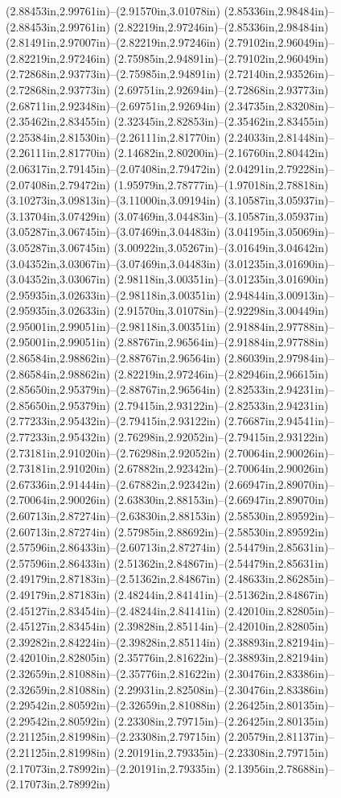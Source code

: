 (2.88453in,2.99761in)--(2.91570in,3.01078in) (2.85336in,2.98484in)--(2.88453in,2.99761in) (2.82219in,2.97246in)--(2.85336in,2.98484in) (2.81491in,2.97007in)--(2.82219in,2.97246in) (2.79102in,2.96049in)--(2.82219in,2.97246in) (2.75985in,2.94891in)--(2.79102in,2.96049in) (2.72868in,2.93773in)--(2.75985in,2.94891in) (2.72140in,2.93526in)--(2.72868in,2.93773in) (2.69751in,2.92694in)--(2.72868in,2.93773in) (2.68711in,2.92348in)--(2.69751in,2.92694in) (2.34735in,2.83208in)--(2.35462in,2.83455in) (2.32345in,2.82853in)--(2.35462in,2.83455in) (2.25384in,2.81530in)--(2.26111in,2.81770in) (2.24033in,2.81448in)--(2.26111in,2.81770in) (2.14682in,2.80200in)--(2.16760in,2.80442in) (2.06317in,2.79145in)--(2.07408in,2.79472in) (2.04291in,2.79228in)--(2.07408in,2.79472in) (1.95979in,2.78777in)--(1.97018in,2.78818in) (3.10273in,3.09813in)--(3.11000in,3.09194in) (3.10587in,3.05937in)--(3.13704in,3.07429in) (3.07469in,3.04483in)--(3.10587in,3.05937in) (3.05287in,3.06745in)--(3.07469in,3.04483in) (3.04195in,3.05069in)--(3.05287in,3.06745in) (3.00922in,3.05267in)--(3.01649in,3.04642in) (3.04352in,3.03067in)--(3.07469in,3.04483in) (3.01235in,3.01690in)--(3.04352in,3.03067in) (2.98118in,3.00351in)--(3.01235in,3.01690in) (2.95935in,3.02633in)--(2.98118in,3.00351in) (2.94844in,3.00913in)--(2.95935in,3.02633in) (2.91570in,3.01078in)--(2.92298in,3.00449in) (2.95001in,2.99051in)--(2.98118in,3.00351in) (2.91884in,2.97788in)--(2.95001in,2.99051in) (2.88767in,2.96564in)--(2.91884in,2.97788in) (2.86584in,2.98862in)--(2.88767in,2.96564in) (2.86039in,2.97984in)--(2.86584in,2.98862in) (2.82219in,2.97246in)--(2.82946in,2.96615in) (2.85650in,2.95379in)--(2.88767in,2.96564in) (2.82533in,2.94231in)--(2.85650in,2.95379in) (2.79415in,2.93122in)--(2.82533in,2.94231in) (2.77233in,2.95432in)--(2.79415in,2.93122in) (2.76687in,2.94541in)--(2.77233in,2.95432in) (2.76298in,2.92052in)--(2.79415in,2.93122in) (2.73181in,2.91020in)--(2.76298in,2.92052in) (2.70064in,2.90026in)--(2.73181in,2.91020in) (2.67882in,2.92342in)--(2.70064in,2.90026in) (2.67336in,2.91444in)--(2.67882in,2.92342in) (2.66947in,2.89070in)--(2.70064in,2.90026in) (2.63830in,2.88153in)--(2.66947in,2.89070in) (2.60713in,2.87274in)--(2.63830in,2.88153in) (2.58530in,2.89592in)--(2.60713in,2.87274in) (2.57985in,2.88692in)--(2.58530in,2.89592in) (2.57596in,2.86433in)--(2.60713in,2.87274in) (2.54479in,2.85631in)--(2.57596in,2.86433in) (2.51362in,2.84867in)--(2.54479in,2.85631in) (2.49179in,2.87183in)--(2.51362in,2.84867in) (2.48633in,2.86285in)--(2.49179in,2.87183in) (2.48244in,2.84141in)--(2.51362in,2.84867in) (2.45127in,2.83454in)--(2.48244in,2.84141in) (2.42010in,2.82805in)--(2.45127in,2.83454in) (2.39828in,2.85114in)--(2.42010in,2.82805in) (2.39282in,2.84224in)--(2.39828in,2.85114in) (2.38893in,2.82194in)--(2.42010in,2.82805in) (2.35776in,2.81622in)--(2.38893in,2.82194in) (2.32659in,2.81088in)--(2.35776in,2.81622in) (2.30476in,2.83386in)--(2.32659in,2.81088in) (2.29931in,2.82508in)--(2.30476in,2.83386in) (2.29542in,2.80592in)--(2.32659in,2.81088in) (2.26425in,2.80135in)--(2.29542in,2.80592in) (2.23308in,2.79715in)--(2.26425in,2.80135in) (2.21125in,2.81998in)--(2.23308in,2.79715in) (2.20579in,2.81137in)--(2.21125in,2.81998in) (2.20191in,2.79335in)--(2.23308in,2.79715in) (2.17073in,2.78992in)--(2.20191in,2.79335in) (2.13956in,2.78688in)--(2.17073in,2.78992in) 